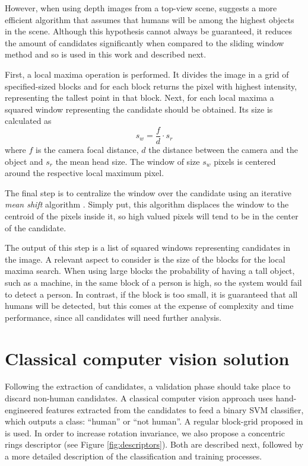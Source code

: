     However, when using depth images from a top-view scene, \cite{rauter} suggests a more efficient algorithm that assumes that humans will be among the highest objects in the scene. Although this hypothesis cannot always be guaranteed, it reduces the amount of candidates significantly when compared to the sliding window method and so is used in this work and described next.

    First, a local maxima operation is performed. It divides the image in a grid of specified-sized blocks and for each block returns the pixel with highest intensity, representing the tallest point in that block. Next, for each local maxima a squared window representing the candidate should be obtained. Its size is calculated as
    \begin{equation}
      s_w = \frac{f}{d} \cdot s_r
    \end{equation}
    where $f$ is the camera focal distance, $d$ the distance between the camera and the object and $s_r$ the mean head size. The window of size $s_w$ pixels is centered around the respective local maximum pixel.

    The final step is to centralize the window over the candidate using an iterative \textit{mean shift} algorithm \cite{meanshift}. Simply put, this algorithm displaces the window to the centroid of the pixels inside it, so high valued pixels will tend to be in the center of the candidate.

    The output of this step is a list of squared windows representing candidates in the image. A relevant aspect to consider is the size of the blocks for the local maxima search. When using large blocks the probability of having a tall object, such as a machine, in the same block of a person is high, so the system would fail to detect a person. In contrast, if the block is too small, it is guaranteed that all humans will be detected, but this comes at the expense of complexity and time performance, since all candidates will need further analysis.

\section{Classical computer vision solution}
\label{sec:classical}

    Following the extraction of candidates, a validation phase should take place to discard non-human candidates. A classical computer vision approach \cite{rauter} uses hand-engineered features extracted from the candidates to feed a binary SVM classifier, which outputs a class: ``human'' or ``not human''. A regular block-grid proposed in \cite{rauter} is used. In order to increase rotation invariance, we also propose a concentric rings descriptor (see Figure \ref{fig:descriptors}). Both are described next, followed by a more detailed description of the classification and training processes.

